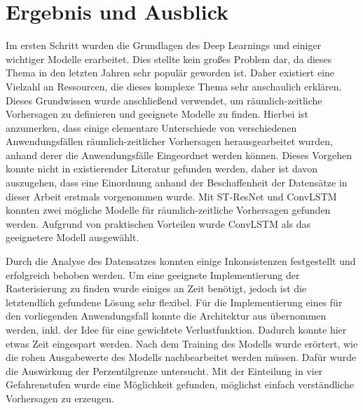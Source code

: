 \section{Ergebnis und Ausblick}
\label{sec:ErgebnisAusblick}
Im ersten Schritt wurden die Grundlagen des Deep Learnings und einiger wichtiger Modelle erarbeitet.
Dies stellte kein großes Problem dar, da dieses Thema in den letzten Jahren sehr populär geworden ist.
Daher existiert eine Vielzahl an Ressourcen, die dieses komplexe Thema sehr anschaulich erklären.
Dieses Grundwissen wurde anschließend verwendet, um räumlich-zeitliche Vorhersagen zu definieren und geeignete Modelle zu finden.
Hierbei ist anzumerken, dass einige elementare Unterschiede von verschiedenen Anwendungsfällen räumlich-zeitlicher Vorhersagen herausgearbeitet wurden, anhand derer die Anwendungsfälle Eingeordnet werden können.
Dieses Vorgehen konnte nicht in existierender Literatur gefunden werden, daher ist davon auszugehen, dass eine Einordnung anhand der Beschaffenheit der Datensätze in dieser Arbeit erstmals vorgenommen wurde.
Mit ST-ResNet und ConvLSTM konnten zwei mögliche Modelle für räumlich-zeitliche Vorhersagen gefunden werden.
Aufgrund von praktischen Vorteilen wurde ConvLSTM als das geeignetere Modell ausgewählt.

Durch die Analyse des Datensatzes konnten einige Inkonsistenzen festgestellt und erfolgreich behoben werden.
Um eine geeignete Implementierung der Rasterisierung zu finden wurde einiges an Zeit benötigt, jedoch ist die letztendlich gefundene Lösung sehr flexibel.
Für die Implementierung eines  für den vorliegenden Anwendungsfall konnte die Architektur aus \cite{CrimeConvLSTM} übernommen werden, inkl. der Idee für eine gewichtete Verlustfunktion.
Dadurch konnte hier etwas Zeit eingespart werden.
Nach dem Training des Modells wurde erörtert, wie die rohen Ausgabewerte des Modells nachbearbeitet werden müssen.
Dafür wurde die Auswirkung der Perzentilgrenze untersucht.
Mit der Einteilung in vier Gefahrenstufen wurde eine Möglichkeit gefunden, möglichst einfach verständliche Vorhersagen zu erzeugen.

